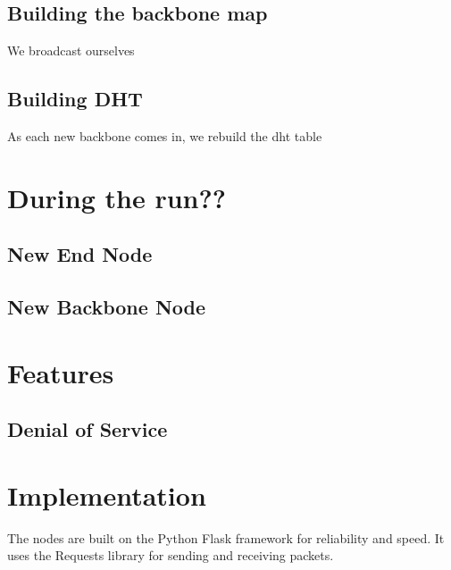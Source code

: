\subsection{Building the backbone map}

We broadcast ourselves

\subsection{Building DHT}
As each new backbone comes in, we rebuild the dht table


\section{During the run??}

\subsection{New End Node}

\subsection{New Backbone Node}

\section{Features}

\subsection{Denial of Service}

\section{Implementation}

The nodes are built on the Python Flask framework for reliability and speed. It uses the Requests library for sending and receiving packets.


